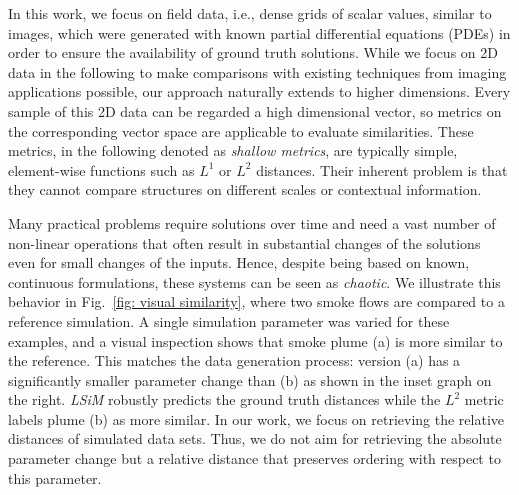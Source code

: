 \documentclass{article}
\begin{document}
In this work, we focus on field data, i.e., dense grids of scalar values, similar to images, which were generated with known partial differential equations (PDEs) in order to ensure the availability of ground truth solutions. While we focus on 2D data in the following to make comparisons with existing techniques from imaging applications possible, our approach naturally extends to higher dimensions.
Every sample of this 2D data can be regarded a high dimensional vector, so metrics on the corresponding vector space are applicable to evaluate similarities. These metrics, in the following denoted as \emph{shallow metrics}, are typically simple, element-wise functions such as $L^1$ or $L^2$ distances. Their inherent problem is that they cannot compare structures on different scales or contextual information.

Many practical problems require solutions over time and need a vast number of non-linear operations that often result in substantial changes of the solutions even for small changes of the inputs. Hence, despite being based on known, continuous formulations, these systems can be seen as \emph{chaotic}.
We illustrate this behavior in Fig.~\ref{fig: visual similarity}, where two smoke flows are compared to a reference simulation. A single simulation parameter was varied for these examples, and a visual inspection shows that smoke plume (a) is more similar to the reference. This matches the data generation process: version (a) has a significantly smaller parameter change than (b) as shown in the inset graph on the right.
\textit{LSiM} robustly predicts the ground truth distances while the $L^2$ metric labels plume (b) as more similar. In our work, we focus on retrieving the relative distances of simulated data sets. Thus, we do not aim for retrieving the absolute parameter change but a relative distance that preserves ordering with respect to this parameter.
\end{document}
